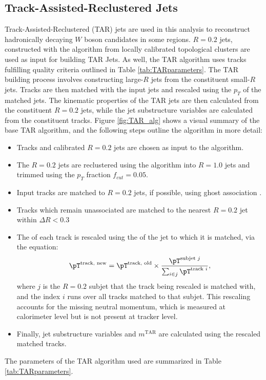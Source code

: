 \subsection{Track-Assisted-Reclustered Jets}
\label{ap:TARjet_object_defs}
Track-Assisted-Reclustered (TAR) jets \cite{TAR} are used in this analysis to reconstruct hadronically decaying $W$ boson candidates in some regions. $R=0.2$ jets, constructed with the \akt algorithm \cite{antikt} from locally calibrated topological clusters \cite{TopoClusters} are used as input for building TAR Jets. As well, the TAR algorithm uses tracks fulfilling quality criteria outlined in Table \ref{tab:TARparameters}. The TAR building process involves constructing large-$R$ jets from the constituent small-$R$ jets. Tracks are then matched with the input jets and rescaled using the $p_T$ of the matched jets. The kinematic properties of the TAR jets are then calculated from the constituent $R=0.2$ jets, while the jet substructure variables are calculated from the constituent tracks. Figure \ref{fig:TAR_alg} shows a visual summary of the base TAR algorithm, and
the following steps outline the algorithm in more detail:
\begin{itemize}
  \item Tracks and calibrated \akt $R=0.2$ jets are chosen as input to the algorithm.
  \item The \akt $R=0.2$ jets are reclustered using the \akt algorithm into $R=1.0$ jets and trimmed using the $p_T$ fraction \(f_{cut}=0.05\).
  \item Input tracks are matched to $R=0.2$ jets, if possible, using ghost association \cite{Ghost}.
  \item Tracks which remain unassociated are matched to the nearest \akt $R=0.2$ jet within $\Delta R<0.3$
  \item The \pT of each track is rescaled using the \pT of the jet to which it is matched, via the equation:
  \begin{equation}
  \pT^{\text{track, new}} = \pT^{\text{track, old}}\times \frac{\pT^{\text{subjet $j$}}}{\sum_{i \in j} \pT^{\text{track $i$}}} ,
  \label{eq:TAR_rescale}
  \end{equation}  where $j$ is the $R=0.2$ subjet that the track being rescaled is matched with, and the index $i$ runs over all tracks matched to that subjet. This rescaling accounts for the missing neutral momentum, which is measured at calorimeter level but is not present at tracker level.
  \item Finally, jet substructure variables and $m^\text{TAR}$ are calculated using the rescaled matched tracks.
\end{itemize}
The parameters of the TAR algorithm used are summarized in Table \ref{tab:TARparameters}. \\

